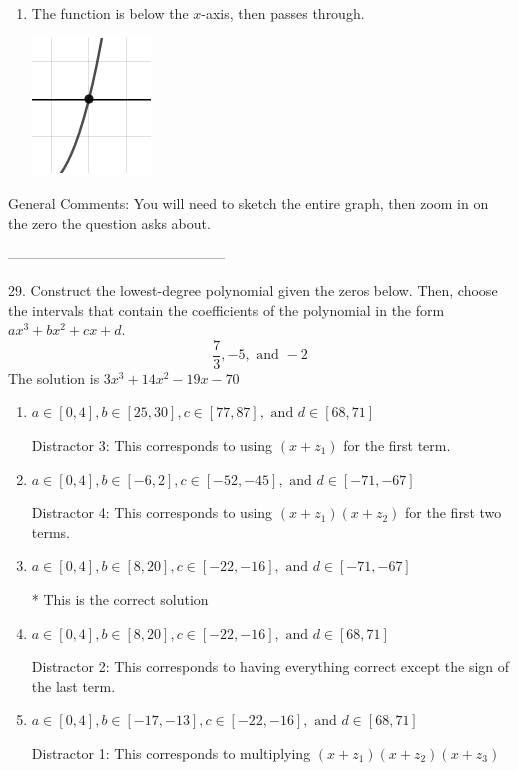 \documentclass{article}[10pt]
\begin{document}
\begin{enumerate}[label=\Alph*.]
\item The function is below the $x$-axis, then passes through. 
\begin{center}\includegraphics[scale=0.5]{../Figures/zeroBehaviorPositiveOdd.png}\end{center} 
 
\end{enumerate} 
 
General Comments: You will need to sketch the entire graph, then zoom in on the zero the question asks about.

-----------------------------------------------

29. Construct the lowest-degree polynomial given the zeros below. Then, choose the intervals that contain the coefficients of the polynomial in the form $ax^3+bx^2+cx+d$.
$$ \frac{7}{3}, -5, \text{ and } -2 $$ 
The solution is $ 3 x^3 + 14 x^2 - 19 x - 70 $ 

\begin{enumerate}[label=\Alph*.] 
\item $ a \in [0, 4], b \in [25, 30], c \in [77, 87], \text{ and } d \in [68, 71] $ 

  Distractor 3: This corresponds to using $(x+z_1)$ for the first term. 
\item $ a \in [0, 4], b \in [-6, 2], c \in [-52, -45], \text{ and } d \in [-71, -67] $ 

  Distractor 4: This corresponds to using $(x+z_1)(x+z_2)$ for the first two terms. 
\item $ a \in [0, 4], b \in [8, 20], c \in [-22, -16], \text{ and } d \in [-71, -67] $ 

 * This is the correct solution 
\item $ a \in [0, 4], b \in [8, 20], c \in [-22, -16], \text{ and } d \in [68, 71] $ 

  Distractor 2: This corresponds to having everything correct except the sign of the last term. 
\item $ a \in [0, 4], b \in [-17, -13], c \in [-22, -16], \text{ and } d \in [68, 71] $ 

  Distractor 1: This corresponds to multiplying $(x+z_1)(x+z_2)(x+z_3)$ 
\end{enumerate} 
 
\end{document}
